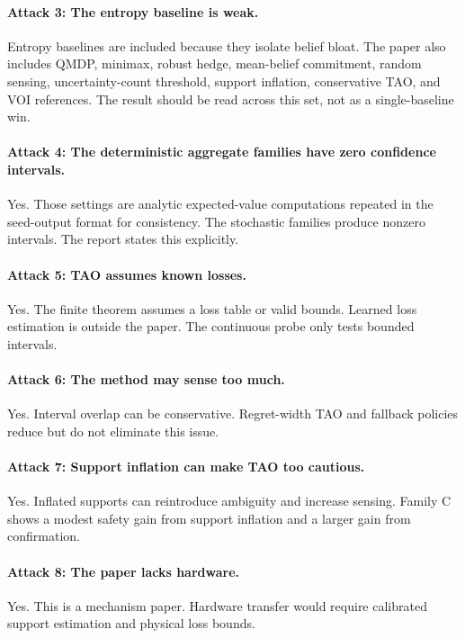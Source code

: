 \documentclass{article}
\begin{document}
\paragraph{Attack 3: The entropy baseline is weak.}
Entropy baselines are included because they isolate belief bloat. The paper also includes QMDP, minimax, robust hedge, mean-belief commitment, random sensing, uncertainty-count threshold, support inflation, conservative TAO, and VOI references. The result should be read across this set, not as a single-baseline win.

\paragraph{Attack 4: The deterministic aggregate families have zero confidence intervals.}
Yes. Those settings are analytic expected-value computations repeated in the seed-output format for consistency. The stochastic families produce nonzero intervals. The report states this explicitly.

\paragraph{Attack 5: TAO assumes known losses.}
Yes. The finite theorem assumes a loss table or valid bounds. Learned loss estimation is outside the paper. The continuous probe only tests bounded intervals.

\paragraph{Attack 6: The method may sense too much.}
Yes. Interval overlap can be conservative. Regret-width TAO and fallback policies reduce but do not eliminate this issue.

\paragraph{Attack 7: Support inflation can make TAO too cautious.}
Yes. Inflated supports can reintroduce ambiguity and increase sensing. Family C shows a modest safety gain from support inflation and a larger gain from confirmation.

\paragraph{Attack 8: The paper lacks hardware.}
Yes. This is a mechanism paper. Hardware transfer would require calibrated support estimation and physical loss bounds.
\end{document}
